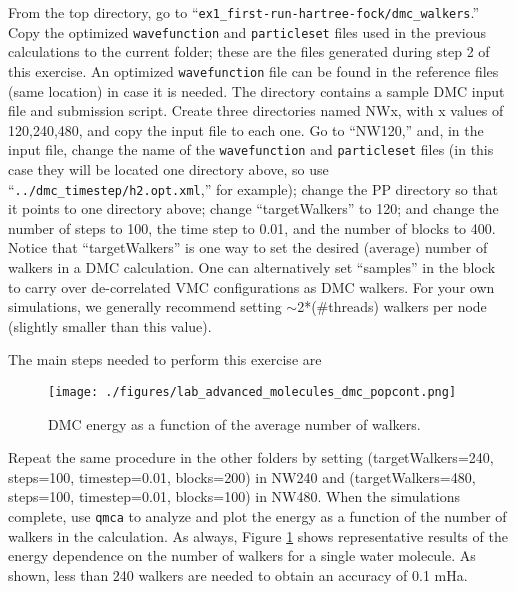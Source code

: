 From the top directory, go to ``\texttt{ex1\_first-run-hartree-fock/dmc\_walkers}.'' Copy the
optimized \texttt{wavefunction} and \texttt{particleset} files used in the previous calculations to the current
folder; these are the files generated during step 2 of this exercise. An optimized \texttt{wavefunction} file can be found in the reference files (same location) in case it is needed. The directory
contains a sample DMC input file and submission script. Create three  directories named NWx,
with x values of 120,240,480, and copy the input file to each one. Go
to ``NW120,'' and, in the input file, change the name of the \texttt{wavefunction} and \texttt{particleset}
files (in this case they will be located one directory above, so use ``\texttt{../dmc\_timestep/h2.opt.xml},'' for
example); change the PP directory so that it points to one directory above; change ``targetWalkers'' to 120; and change the number of steps to 100, the time step
to 0.01, and the number of blocks to 400. Notice that ``targetWalkers'' is one way to set the desired (average) number of walkers in a DMC calculation. One can alternatively set ``samples'' in the  block to carry over de-correlated VMC configurations as DMC walkers. For your own simulations, we generally recommend setting $\sim$2*(\#threads)
walkers per node (slightly smaller than this value).

The main steps needed to perform this exercise are

\begin{figure}
\begin{center}
\texttt{[image: ./figures/lab\_advanced\_molecules\_dmc\_popcont.png]}
\end{center}
\caption{DMC energy as a function of the average number of walkers.}
\label{fig:lam_dmc_popcont}
\end{figure}

Repeat the same procedure in the other folders by setting (targetWalkers=240,
steps=100, timestep=0.01, blocks=200) in NW240 and (targetWalkers=480, 
steps=100, timestep=0.01, blocks=100) in NW480. When
the simulations complete, use \texttt{qmca} to analyze and plot the energy as a function of the
number of walkers in the calculation. As always, Figure \ref{fig:lam_dmc_popcont} 
shows representative results of the
energy dependence on the number of walkers for a single water molecule. As shown,
less than 240 walkers are needed to obtain an accuracy of 0.1 mHa.


